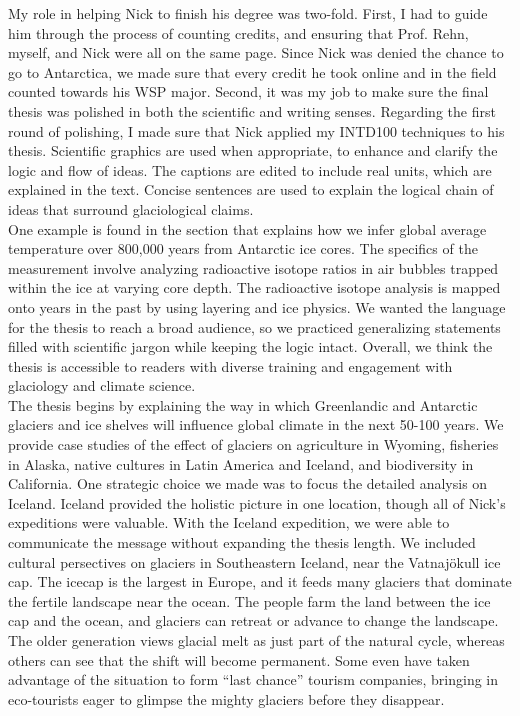 \documentclass[../../../main.tex]{subfiles}
\begin{document}
My role in helping Nick to finish his degree was two-fold.  First, I had to guide him through the process of counting credits, and ensuring that Prof. Rehn, myself, and Nick were all on the same page.  Since Nick was denied the chance to go to Antarctica, we made sure that every credit he took online and in the field counted towards his WSP major.  Second, it was my job to make sure the final thesis was polished in both the scientific and writing senses.  Regarding the first round of polishing, I made sure that Nick applied my INTD100 techniques to his thesis.  Scientific graphics are used when appropriate, to enhance and clarify the logic and flow of ideas.  The captions are edited to include real units, which are explained in the text.  Concise sentences are used to explain the logical chain of ideas that surround glaciological claims.
\\
\vspace{0.15cm}
One example is found in the section that explains how we infer global average temperature over 800,000 years from Antarctic ice cores.  The specifics of the measurement involve analyzing radioactive isotope ratios in air bubbles trapped within the ice at varying core depth.  The radioactive isotope analysis is mapped onto years in the past by using layering and ice physics.  We wanted the language for the thesis to reach a broad audience, so we practiced generalizing statements filled with scientific jargon while keeping the logic intact.  Overall, we think the thesis is accessible to readers with diverse training and engagement with glaciology and climate science.
\\
\vspace{0.15cm}
The thesis begins by explaining the way in which Greenlandic and Antarctic glaciers and ice shelves will influence global climate in the next 50-100 years.  We provide case studies of the effect of glaciers on agriculture in Wyoming, fisheries in Alaska, native cultures in Latin America and Iceland, and biodiversity in California.  One strategic choice we made was to focus the detailed analysis on Iceland.  Iceland provided the holistic picture in one location, though all of Nick's expeditions were valuable.  With the Iceland expedition, we were able to communicate the message without expanding the thesis length.  We included cultural persectives on glaciers in Southeastern Iceland, near the Vatnaj\"{o}kull ice cap.  The icecap is the largest in Europe, and it feeds many glaciers that dominate the fertile landscape near the ocean.  The people farm the land between the ice cap and the ocean, and glaciers can retreat or advance to change the landscape.  The older generation views glacial melt as just part of the natural cycle, whereas others can see that the shift will become permanent.  Some even have taken advantage of the situation to form ``last chance'' tourism companies, bringing in eco-tourists eager to glimpse the mighty glaciers before they disappear.
\end{document}
